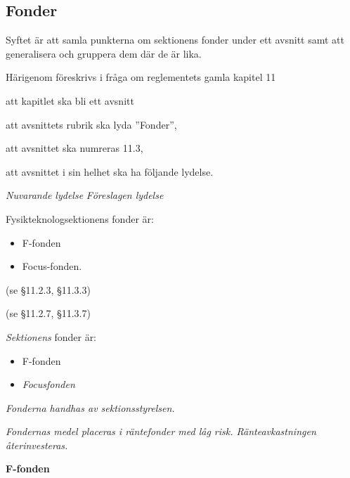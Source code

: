 \documentclass{article}
\newenvironment{lydelse}
    {\begin{paracol}{2}%
        \emph{Nuvarande lydelse}%
        \switchcolumn%
        \emph{Föreslagen lydelse}%
    \end{paracol}%
    \begin{enumerate}[label=\thesubsection.\arabic*]%
    \begin{paracol}{2}%
    }{\end{paracol}\end{enumerate}}
\begin{document}
\subsection{Fonder}
Syftet är att samla punkterna om sektionens fonder under ett avsnitt samt att generalisera och gruppera dem där de är lika. 

Härigenom föreskrivs i fråga om reglementets gamla kapitel 11

\begin{dels}
    \item att kapitlet ska bli ett avsnitt
    \item att avsnittets rubrik ska lyda ''Fonder'',
    \item att avsnittet ska numreras 11.3,
    \item att avsnittet i sin helhet ska ha följande lydelse.
\end{dels}
\begin{lydelse}
    \setcounter{section}{11}
    \setcounter{subsection}{1}

    \item Fysikteknologsektionens fonder är:
	\begin{itemize}
		\item F-fonden
		\item Focus-fonden.
	\end{itemize}
	
	\item[] (se \S11.2.3, \S11.3.3)
	
	\item[] (se \S11.2.7, \S11.3.7)
    
    \setcounter{section}{11}
    \setcounter{subsection}{3}
    \switchcolumn
  
   \item \emph{Sektionens} fonder är:
    \begin{itemize}
        \item F-fonden
        \item \emph{Focusfonden}
    \end{itemize}

   \item \emph{Fonderna handhas av sektionsstyrelsen.}
   \label{R:FondHantSekt}
    
   \item \emph{Fondernas medel placeras i räntefonder med låg risk.
    Ränteavkastningen återinvesteras.}
    \label{R:FondRantAter}

\end{lydelse}
\textbf{F-fonden}
\end{document}
